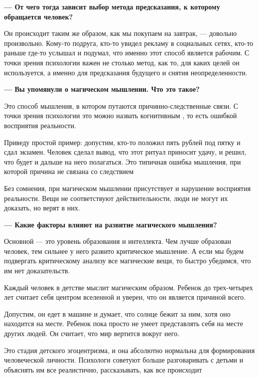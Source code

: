 \textbf{--- От чего тогда зависит выбор метода предсказания, к которому обращается человек?}

Он происходит таким же образом, как мы покупаем  на завтрак, — довольно произвольно. Кому-то  подруга, кто-то увидел рекламу в социальных сетях, кто-то раньше где-то услышал и подумал, что именно этот способ является рабочим. С точки зрения психологии важен не столько метод, как то, для каких целей он используется, а именно для предсказания будущего и снятия неопределенности.

\textbf{--- Вы упомянули о магическом мышлении. Что это такое?}

Это способ мышления, в котором путаются причинно-следственные связи. С точки зрения психологии это можно назвать когнитивным , то есть ошибкой восприятия реальности.

\begin{fancyquotes}
    Приведу простой пример: допустим, кто-то положил пять рублей под пятку и сдал экзамен. Человек сделал вывод, что этот ритуал приносит удачу, и решил, что будет и дальше на него полагаться. Это типичная ошибка мышления, при которой причина не связана со следствием
\end{fancyquotes}

Без сомнения, при магическом мышлении присутствует и нарушение восприятия реальности. Вещи не соответствуют действительности, люди не могут их доказать, но верят в них.

\textbf{--- Какие факторы влияют на развитие магического мышления?}

Основной — это уровень образования и интеллекта. Чем лучше образован человек, тем сильнее у него развито критическое мышление. А если мы будем подвергать критическому анализу все магические вещи, то быстро убедимся, что им нет доказательств.

Каждый человек в детстве мыслит магическим образом. Ребенок до трех-четырех лет считает себя центром вселенной и уверен, что он является причиной всего.

Допустим, он едет в машине и думает, что солнце бежит за ним, хотя оно находится на месте. Ребенок пока просто не умеет представлять себя на месте других людей. Он считает, что мир вертится вокруг него.

\begin{fancyquotes}
    Это стадия детского эгоцентризма, и она абсолютно нормальна для формирования человеческой личности. Психологи советуют больше разговаривать с детьми и объяснять им все реалистично, рассказывать, как все происходит
\end{fancyquotes}

